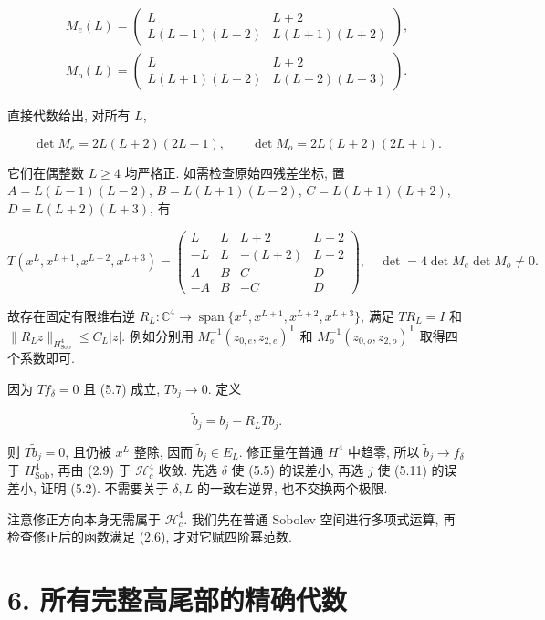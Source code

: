 \documentclass[UTF8,fontset=fandol,11pt,a4paper]{ctexart}
\begin{document}
\[
\begin{gathered}
 M_e(L)=
 \begin{pmatrix}
 L&L+2\\
 L(L-1)(L-2)&L(L+1)(L+2)
 \end{pmatrix},
 \\
 M_o(L)=
 \begin{pmatrix}
 L&L+2\\
 L(L+1)(L-2)&L(L+2)(L+3)
 \end{pmatrix}.
\end{gathered}
 \tag{5.8}
\]


直接代数给出, 对所有 \(L\),


\[
 \det M_e=2L(L+2)(2L-1),\qquad
 \det M_o=2L(L+2)(2L+1).
 \tag{5.9}
\]


它们在偶整数 \(L\ge4\) 均严格正. 如需检查原始四残差坐标, 置
\(A=L(L-1)(L-2)\), \(B=L(L+1)(L-2)\),
\(C=L(L+1)(L+2)\), \(D=L(L+2)(L+3)\), 有


\[
 T(x^L,x^{L+1},x^{L+2},x^{L+3})=
 \begin{pmatrix}
 L&L&L+2&L+2\\
 -L&L&-(L+2)&L+2\\
 A&B&C&D\\
 -A&B&-C&D
 \end{pmatrix},
 \quad \det=4\det M_e\det M_o\ne0.
 \tag{5.10}
\]


故存在固定有限维右逆
\(R_L:\mathbb C^4\to\operatorname{span}\{x^L,x^{L+1},x^{L+2},x^{L+3}\}\),
满足 \(TR_L=I\) 和
\(\|R_Lz\|_{H_{\mathrm{Sob}}^4}\le C_L|z|\).
例如分别用 \(M_e^{-1}(z_{0,e},z_{2,e})^{\mathsf T}\) 和
\(M_o^{-1}(z_{0,o},z_{2,o})^{\mathsf T}\) 取得四个系数即可.


因为 \(Tf_\delta=0\) 且 (5.7) 成立, \(Tb_j\to0\). 定义


\[
 \widetilde b_j=b_j-R_LTb_j.
 \tag{5.11}
\]


则 \(T\widetilde b_j=0\), 且仍被 \(x^L\) 整除, 因而 \(\widetilde b_j\in E_L\).
修正量在普通 \(H^4\) 中趋零, 所以
\(\widetilde b_j\to f_\delta\) 于 \(H_{\mathrm{Sob}}^4\), 再由 (2.9) 于 \(\mathcal H_c^4\) 收敛.
先选 \(\delta\) 使 (5.5) 的误差小, 再选 \(j\) 使 (5.11) 的误差小, 证明 (5.2).
不需要关于 \(\delta,L\) 的一致右逆界, 也不交换两个极限.


注意修正方向本身无需属于 \(\mathcal H_c^4\). 我们先在普通 Sobolev 空间进行多项式运算, 再检查修正后的函数满足 (2.6), 才对它赋四阶幂范数.


\section*{6. 所有完整高尾部的精确代数}
\end{document}
